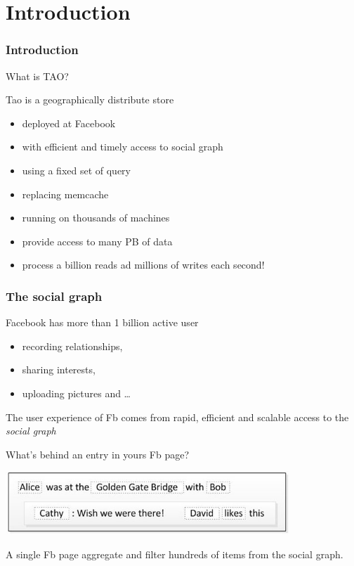 
\setlength{\parskip}{\baselineskip} 
\section*{Introduction}
\begin{frame}[t]
\frametitle{Introduction}
What is TAO?

\begin{block}{Tao}
	is a geographically distribute store
	\begin{itemize}
		\item deployed at Facebook
	 	\item with efficient and timely access to social graph
	 	\item using a fixed set of query
	 	\item replacing memcache
	 	\item running on thousands of machines
	 	\item provide access to many PB of data
	 	\item process a billion reads ad millions of writes each second!
	 \end{itemize} 
\end{block}
\end{frame}

\begin{frame}
\frametitle{The social graph}
Facebook has more than 1 billion active user 
\begin{itemize}
	\item recording relationships,
	\item sharing interests,
	\item uploading pictures and \dots
\end{itemize}

The user experience of Fb comes from rapid, efficient and scalable access to the \emph{social graph}
\end{frame}

\begin{frame}
	What's behind an entry in yours Fb page?

	\begin{center}
	\includegraphics[width=0.8\textwidth]{figs/social.jpg}	\\
	\end{center}
	A single Fb page aggregate and filter hundreds of items from the social graph.
\end{frame}%

